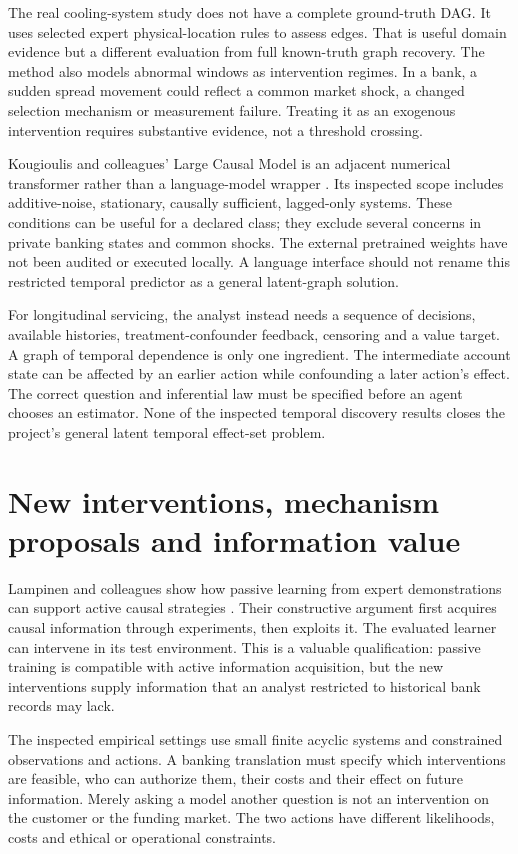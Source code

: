 The real cooling-system study does not have a complete ground-truth DAG. It
uses selected expert physical-location rules to assess edges. That is useful
domain evidence but a different evaluation from full known-truth graph
recovery. The method also models abnormal windows as intervention regimes.
In a bank, a sudden spread movement could reflect a common market shock, a
changed selection mechanism or measurement failure. Treating it as an
exogenous intervention requires substantive evidence, not a threshold crossing.

Kougioulis and colleagues' Large Causal Model is an adjacent numerical
transformer rather than a language-model wrapper
\citep{v12_la_2602_18662}. Its inspected scope includes additive-noise,
stationary, causally sufficient, lagged-only systems. These conditions can be
useful for a declared class; they exclude several concerns in private banking
states and common shocks. The external pretrained weights have not been
audited or executed locally. A language interface should not rename this
restricted temporal predictor as a general latent-graph solution.

For longitudinal servicing, the analyst instead needs a sequence of decisions,
available histories, treatment-confounder feedback, censoring and a value
target. A graph of temporal dependence is only one ingredient. The
intermediate account state can be affected by an earlier action while
confounding a later action's effect. The correct question and inferential law
must be specified before an agent chooses an estimator. None of the inspected
temporal discovery results closes the project's general latent temporal
effect-set problem.

\section{New interventions, mechanism proposals and information value}

Lampinen and colleagues show how passive learning from expert demonstrations
can support active causal strategies \citep{v12_la_2305_16183}. Their
constructive argument first acquires causal information through experiments,
then exploits it. The evaluated learner can intervene in its test environment.
This is a valuable qualification: passive training is compatible with active
information acquisition, but the new interventions supply information that an
analyst restricted to historical bank records may lack.

The inspected empirical settings use small finite acyclic systems and
constrained observations and actions. A banking translation must specify which
interventions are feasible, who can authorize them, their costs and their
effect on future information. Merely asking a model another question is not
an intervention on the customer or the funding market. The two actions have
different likelihoods, costs and ethical or operational constraints.


